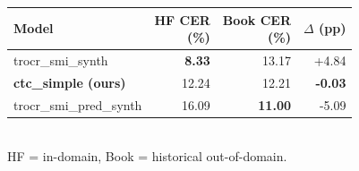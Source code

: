 \documentclass[30pt, a0paper, portrait,
               margin=0mm, innermargin=15mm,
               blockverticalspace=12mm, colspace=15mm, subcolspace=8mm]{tikzposter}
\newcommand{\ctcCER}{12.24}
\newcommand{\trocrSynthHFCER}{8.33}
\newcommand{\trocrSynthBookCER}{13.17}
\newcommand{\trocrSynthDeltaCER}{4.84}
\newcommand{\ctcBookCER}{12.21}
\newcommand{\trocrPredSynthHFCER}{16.09}
\newcommand{\trocrPredSynthBookCER}{11.00}
\newcommand{\trocrPredSynthDeltaCER}{5.09}
\begin{document}
\begin{columns}
{\begin{center}
\normalsize
\begin{tabular}{@{}lrrr@{}}
\toprule
Model & \shortstack{HF CER\\(\%)} & \shortstack{Book CER\\(\%)} & $\Delta$ (pp) \\
\midrule
trocr\_smi\_synth          & \textbf{\trocrSynthHFCER}  & \trocrSynthBookCER         & +\trocrSynthDeltaCER \\
\textbf{ctc\_simple (ours)}& \ctcCER                    & \ctcBookCER                & \textbf{-0.03} \\
trocr\_smi\_pred\_synth    & \trocrPredSynthHFCER       & \textbf{\trocrPredSynthBookCER} & -\trocrPredSynthDeltaCER \\
\bottomrule
\end{tabular}\\[1mm]
\footnotesize HF = in-domain, Book = historical out-of-domain.
\end{center}




}
\end{columns}
\end{document}
